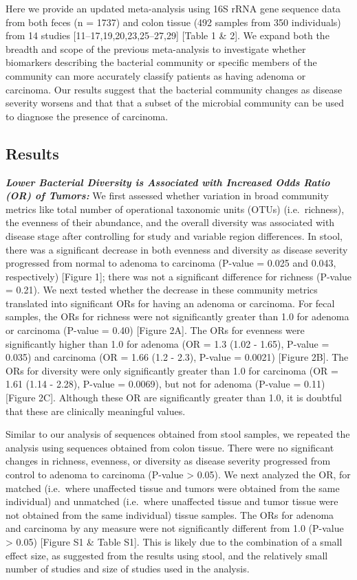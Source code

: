 \documentclass[12pt,]{article}
\begin{document}
Here we provide an updated meta-analysis using 16S rRNA gene sequence
data from both feces (n = 1737) and colon tissue (492 samples from 350
individuals) from 14 studies {[}11--17,19,20,23,25--27,29{]} {[}Table 1
\& 2{]}. We expand both the breadth and scope of the previous
meta-analysis to investigate whether biomarkers describing the bacterial
community or specific members of the community can more accurately
classify patients as having adenoma or carcinoma. Our results suggest
that the bacterial community changes as disease severity worsens and
that that a subset of the microbial community can be used to diagnose
the presence of carcinoma.

\newpage

\subsection{Results}\label{results}

\textbf{\emph{Lower Bacterial Diversity is Associated with Increased
Odds Ratio (OR) of Tumors:}} We first assessed whether variation in
broad community metrics like total number of operational taxonomic units
(OTUs) (i.e.~richness), the evenness of their abundance, and the overall
diversity was associated with disease stage after controlling for study
and variable region differences. In stool, there was a significant
decrease in both evenness and diversity as disease severity progressed
from normal to adenoma to carcinoma (P-value = 0.025 and 0.043,
respectively) {[}Figure 1{]}; there was not a significant difference for
richness (P-value = 0.21). We next tested whether the decrease in these
community metrics translated into significant ORs for having an adenoma
or carcinoma. For fecal samples, the ORs for richness were not
significantly greater than 1.0 for adenoma or carcinoma (P-value = 0.40)
{[}Figure 2A{]}. The ORs for evenness were significantly higher than 1.0
for adenoma (OR = 1.3 (1.02 - 1.65), P-value = 0.035) and carcinoma (OR
= 1.66 (1.2 - 2.3), P-value = 0.0021) {[}Figure 2B{]}. The ORs for
diversity were only significantly greater than 1.0 for carcinoma (OR =
1.61 (1.14 - 2.28), P-value = 0.0069), but not for adenoma (P-value =
0.11) {[}Figure 2C{]}. Although these OR are significantly greater than
1.0, it is doubtful that these are clinically meaningful values.

Similar to our analysis of sequences obtained from stool samples, we
repeated the analysis using sequences obtained from colon tissue. There
were no significant changes in richness, evenness, or diversity as
disease severity progressed from control to adenoma to carcinoma
(P-value \textgreater{} 0.05). We next analyzed the OR, for matched
(i.e.~where unaffected tissue and tumors were obtained from the same
individual) and unmatched (i.e.~where unaffected tissue and tumor tissue
were not obtained from the same individual) tissue samples. The ORs for
adenoma and carcinoma by any measure were not significantly different
from 1.0 (P-value \textgreater{} 0.05) {[}Figure S1 \& Table S1{]}. This
is likely due to the combination of a small effect size, as suggested
from the results using stool, and the relatively small number of studies
and size of studies used in the analysis.
\end{document}
